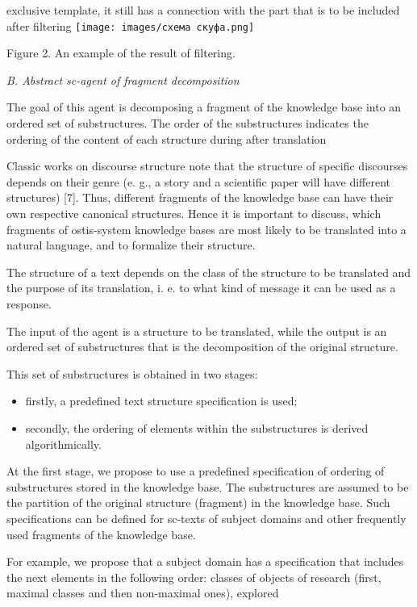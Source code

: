 \documentclass[9pt, a4paper]{article}
\begin{document}
\hspace{4mm}
\begin{minipage}{0.46\textwidth}
\parindent 2mm
\vspace{15mm}
exclusive template, it still has a connection with the part
that is to be included after filtering
\texttt{[image: images/схема скуфа.png]}
\begin{center}
    \footnotesize{Figure 2. An example of the result of filtering.}
\end{center}
\vspace{5mm}

\small{\textit{B. Abstract sc-agent of fragment decomposition}}


\normalsize{The goal of this agent is decomposing a fragment of
the knowledge base into an ordered set of substructures.
The order of the substructures indicates the ordering of
the content of each structure during after translation


Classic works on discourse structure note that the
structure of specific discourses depends on their genre
(e. g., a story and a scientific paper will have different
structures) [7]. Thus, different fragments of the knowledge base can have their own respective canonical structures. Hence it is important to discuss, which fragments
of ostis-system knowledge bases are most likely to be
translated into a natural language, and to formalize their
structure.


The structure of a text depends on the class of the
structure to be translated and the purpose of its translation, i. e. to what kind of message it can be used as a
response.


The input of the agent is a structure to be translated,
while the output is an ordered set of substructures that
is the decomposition of the original structure.


This set of substructures is obtained in two stages:}
\begin{itemize}
    \item firstly, a predefined text structure specification is
used;
    \item secondly, the ordering of elements within the substructures is derived algorithmically.
\end{itemize}


At the first stage, we propose to use a predefined
specification of ordering of substructures stored in the
knowledge base. The substructures are assumed to be
the partition of the original structure (fragment) in the
knowledge base. Such specifications can be defined for
sc-texts of subject domains and other frequently used
fragments of the knowledge base.


For example, we propose that a subject domain has
a specification that includes the next elements in the
following order: classes of objects of research (first,
maximal classes and then non-maximal ones), explored
\end{minipage}
\end{document}
